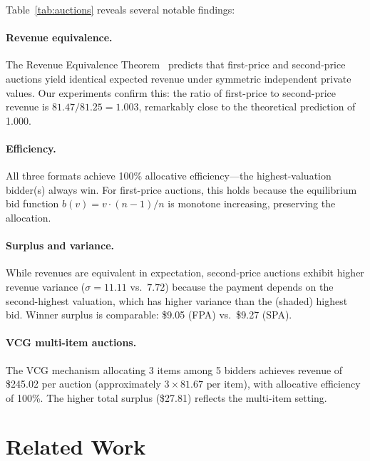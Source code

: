 \documentclass[10pt]{article}
\begin{document}
Table~\ref{tab:auctions} reveals several notable findings:

\paragraph{Revenue equivalence.}
The Revenue Equivalence Theorem~\citep{myerson1981optimal, riley1981optimal} predicts that first-price and second-price auctions yield identical expected revenue under symmetric independent private values. Our experiments confirm this: the ratio of first-price to second-price revenue is $81.47/81.25 = 1.003$, remarkably close to the theoretical prediction of 1.000.

\paragraph{Efficiency.}
All three formats achieve 100\% allocative efficiency---the highest-valuation bidder(s) always win. For first-price auctions, this holds because the equilibrium bid function $b(v) = v \cdot (n-1)/n$ is monotone increasing, preserving the allocation.

\paragraph{Surplus and variance.}
While revenues are equivalent in expectation, second-price auctions exhibit higher revenue variance ($\sigma = 11.11$ vs.\ $7.72$) because the payment depends on the second-highest valuation, which has higher variance than the (shaded) highest bid. Winner surplus is comparable: \$9.05 (FPA) vs.\ \$9.27 (SPA).

\paragraph{VCG multi-item auctions.}
The VCG mechanism allocating 3 items among 5 bidders achieves revenue of \$245.02 per auction (approximately $3 \times 81.67$ per item), with allocative efficiency of 100\%. The higher total surplus (\$27.81) reflects the multi-item setting.

\section{Related Work}
\label{sec:related}
\end{document}
